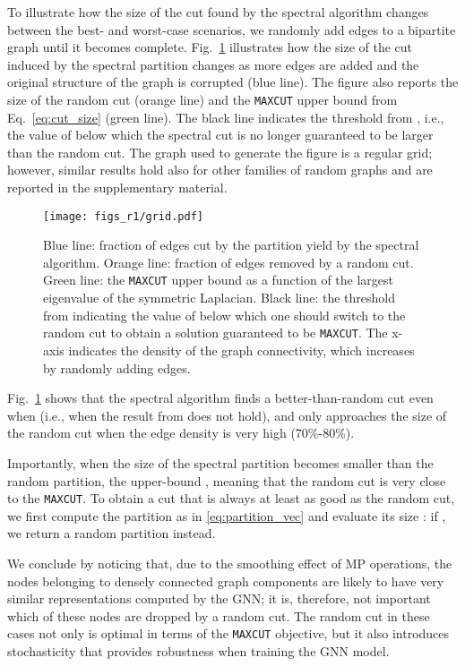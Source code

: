 \documentclass[journal]{IEEEtran}
\newcommand{\maxcut}{\texttt{\small{MAXCUT}}}
\begin{document}
To illustrate how the size of the cut found by the spectral algorithm changes between the best- and worst-case scenarios, we randomly add edges to a bipartite graph until it becomes complete.
Fig.~\ref{fig:adding_edges} illustrates how the size of the cut  induced by the spectral partition  changes as more edges are added and the original structure of the graph is corrupted (blue line). The figure also reports the size of the random cut (orange line) and the \maxcut{} upper bound from Eq.~\eqref{eq:cut_size} (green line). The black line indicates the threshold from \cite{trevisan2012max}, i.e., the value of  below which the spectral cut is no longer guaranteed to be larger than the random cut.
The graph used to generate the figure is a regular grid; however, similar results hold also for other families of random graphs and are reported in the supplementary material.
\begin{figure}[!ht]
    \centering
    \texttt{[image: figs\_r1/grid.pdf]}    
    \caption{
    Blue line: fraction of edges cut by the partition yield by the spectral algorithm. 
    Orange line: fraction of edges removed by a random cut. 
    Green line: the \maxcut{} upper bound as a function of the largest eigenvalue  of the symmetric Laplacian. 
    Black line: the threshold from \cite{trevisan2012max} indicating the value of  below which one should switch to the random cut to obtain a solution guaranteed to be \maxcut{}. 
    The x-axis indicates the density of the graph connectivity, which increases by randomly adding edges.}
    \label{fig:adding_edges}
\end{figure}


Fig.~\ref{fig:adding_edges} shows that the spectral algorithm finds a better-than-random cut even when  (i.e., when the result from \cite{trevisan2012max} does not hold), and only approaches the size of the random cut when the edge density is very high (70\%-80\%). 

Importantly, when the size of the spectral partition becomes smaller than the random partition, the upper-bound , meaning that the random cut is very close to the \maxcut{}.
To obtain a cut that is always at least as good as the random cut, we first compute the partition  as in \eqref{eq:partition_vec} and evaluate its size : if , we return a random partition instead.


We conclude by noticing that, due to the smoothing effect of MP operations, the nodes belonging to densely connected graph components are likely to have very similar representations computed by the GNN; it is, therefore, not important which of these nodes are dropped by a random cut.
The random cut in these cases not only is optimal in terms of the \maxcut{} objective, but it also introduces stochasticity that provides robustness when training the GNN model.
\end{document}
